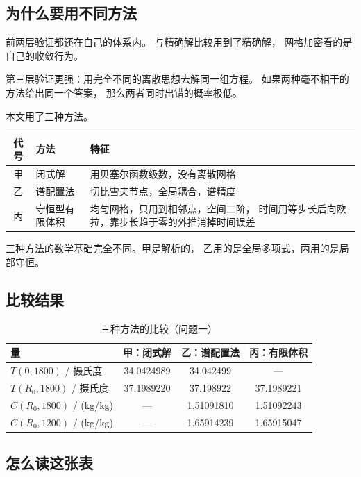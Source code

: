 \subsection{为什么要用不同方法}

前两层验证都还在自己的体系内。
与精确解比较用到了精确解，
网格加密看的是自己的收敛行为。

第三层验证更强：用完全不同的离散思想去解同一组方程。
如果两种毫不相干的方法给出同一个答案，
那么两者同时出错的概率极低。

本文用了三种方法。

\begin{center}
\begin{tabular}{@{}clp{7.4cm}@{}}
\toprule
代号 & 方法 & 特征 \\
\midrule
甲 & 闭式解 & 用贝塞尔函数级数，没有离散网格 \\
乙 & 谱配置法 & 切比雪夫节点，全局耦合，谱精度 \\
丙 & 守恒型有限体积 & 均匀网格，只用到相邻点，空间二阶，
时间用等步长后向欧拉，靠步长趋于零的外推消掉时间误差 \\
\bottomrule
\end{tabular}
\end{center}

三种方法的数学基础完全不同。甲是解析的，
乙用的是全局多项式，丙用的是局部守恒。

\subsection{比较结果}

\begin{table}[H]
\centering
\small
\caption{三种方法的比较（问题一）}
\begin{tabular}{@{}lccc@{}}
\toprule
量 & 甲：闭式解 & 乙：谱配置法 & 丙：有限体积 \\
\midrule
$T(0,1800)$ / 摄氏度 & 34.0424989 & 34.042499 & --- \\
$T(R_0,1800)$ / 摄氏度 & 37.1989220 & 37.198922 & 37.1989221 \\
$C(R_0,1800)$ / (kg/kg) & --- & 1.51091810 & 1.51092243 \\
$C(R_0,1200)$ / (kg/kg) & --- & 1.65914239 & 1.65915047 \\
\bottomrule
\end{tabular}
\end{table}

\subsection{怎么读这张表}

